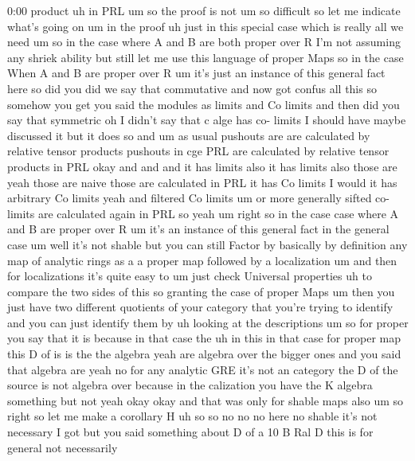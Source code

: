 \begin{unfinished}{0:00}
product  uh  in
PRL
um  so  the  proof  is  not  um  so  difficult
so  let  me  indicate  what's  going  on  um  in
the  proof  uh  just  in  this  special  case
which  is  really  all  we  need
um  so  in  the  case  where  A  and  B  are  both
proper  over  R  I'm  not  assuming  any
shriek  ability  but  still  let  me  use  this
language  of  proper  Maps  so  in  the  case
When  A  and  B  are  proper  over  R  um  it's
just  an  instance  of  this  general  fact
here  so  did  you  did  we  say  that
commutative  and  now  got  confus  all  this
so  somehow  you  get  you  said  the  modules
as  limits  and  Co
limits  and  then  did  you  say
that
symmetric  oh  I  didn't  say  that  c  alge
has  co-  limits  I  should  have  maybe
discussed  it  but  it  does  so  and  um  as
usual  pushouts  are  are  calculated  by
relative  tensor  products  pushouts  in  cge
PRL  are  calculated  by  relative  tensor
products  in
PRL  okay  and  and  and  it  has  limits  also
it  has  limits  also  those  are  yeah  those
are  naive  those  are  calculated  in  PRL  it
has  Co  limits  I  would  it  has  arbitrary
Co  limits  yeah  and  filtered  Co  limits  um
or  more  generally  sifted  co-  limits  are
calculated  again  in
PRL  so  yeah  um  right  so  in  the  case  case
where  A  and  B  are  proper  over  R  um  it's
an  instance  of  this  general  fact  in  the
general  case  um  well  it's  not  shable  but
you  can  still  Factor  by  basically  by
definition  any  map  of  analytic  rings  as
a  a  proper  map  followed  by  a
localization  um  and  then  for
localizations  it's  quite  easy  to  um  just
check  Universal  properties  uh  to  compare
the  two  sides  of  this  so  granting  the
case  of  proper  Maps  um  then  you  just
have  two  different  quotients  of  your
category  that  you're  trying  to  identify
and  you  can  just  identify  them  by  uh
looking  at  the
descriptions
um  so  for  proper  you  say  that  it
is  because  in  that
case
the  uh  in  this  in  that  case  for  proper
map  this  D  of  is  is  the  the
algebra  yeah  are  algebra  over  the  bigger
ones  and  you  said  that  algebra  are
yeah  no  for  any  analytic  GRE  it's  not  an
category  the  D  of  the  source  is  not
algebra  over  because  in  the  calization
you  have  the  K  algebra  something  but  not
yeah  okay  okay  and  that  was  only  for
shable  maps  also  um
so  right  so  let  me  make  a  corollary  H  uh
so
so  no  no  no  here  no  shable  it's  not
necessary  I  got  but  you  said  something
about  D  of  a  10  B  Ral
D  this  is  for  general  not  necessarily

\end{unfinished}

